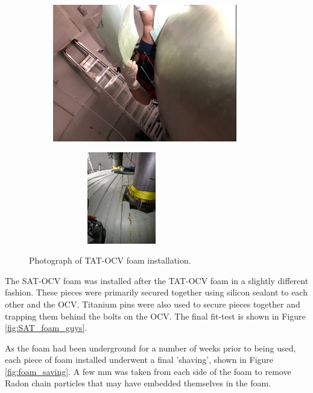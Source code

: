 \begin{figure}[!htbp]
\begin{subfigure}{.5\textwidth}
  \centering
  \includegraphics[height=6cm, width=\linewidth]{Figures/Construction/TAT_foam_installation.png}
  \end{subfigure}
  \begin{subfigure}{.5\textwidth}
  \centering
  \includegraphics[height=4cm, width=6cm, angle=-90, width=\linewidth]{Figures/Construction/TAT_foam_complete.jpg}
  \end{subfigure}
\caption{Photograph of TAT-OCV foam installation.}
\label{fig:TAT_foam_installation}
\end{figure}

\par
The SAT-OCV foam was installed after the TAT-OCV foam in a slightly different fashion.
These pieces were primarily secured together using silicon sealant \cite{dowsil_silicone_ref} to each other and the OCV.
Titanium pins were also used to secure pieces together and trapping them behind the bolts on the OCV.
The final fit-test is shown in Figure \ref{fig:SAT_foam_guys}.

\par
As the foam had been underground for a number of weeks prior to being used, each piece of foam installed underwent a final 'shaving', shown in Figure \ref{fig:foam_saving}.
A few mm was taken from each side of the foam to remove Radon chain particles that may have embedded themselves in the foam.


